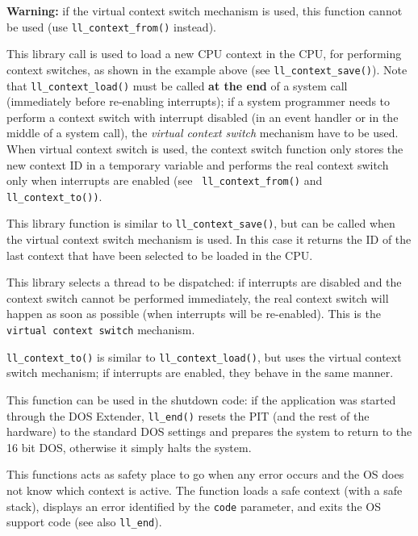 \documentclass[a4paper]{report}
\begin{document}
{\bf Warning:} if the virtual context switch mechanism is used, this
function cannot be used (use {\tt ll\_context\_from()} instead).


This library call is used to load a new CPU context in the CPU, for
performing context switches, as shown in the example above (see
{\tt ll\_context\_save()}). Note that {\tt ll\_context\_load()} must
be called {\bf at the end} of a system call (immediately before re-enabling
interrupts); if a system programmer needs to perform a context switch
with interrupt disabled (in an event handler or in the middle of a
system call), the {\em virtual context switch} mechanism have to be used.
When virtual context switch is used, the context switch function only
stores the new context ID in a temporary variable and performs the
real context switch only when interrupts are enabled (see {\tt
ll\_context\_from()} and {\tt ll\_context\_to())}.


This library function is similar to {\tt ll\_context\_save()}, but
can be called when the virtual context switch mechanism is used. In
this case it returns the ID of the last context that have been
selected to be loaded in the CPU.


This library selects a thread to be dispatched: if interrupts are
disabled and the context switch cannot be performed immediately, the
real context switch will happen as soon as possible (when interrupts
will be re-enabled). This is the {\tt virtual context switch}
mechanism.

{\tt ll\_context\_to()} is similar to {\tt ll\_context\_load()}, but
uses the virtual context switch mechanism; if interrupts are enabled,
they behave in the same manner.


This function can be used in the shutdown code: if the application
was started through the DOS Extender, {\tt ll\_end()} resets the PIT
(and the rest of the hardware) to the standard DOS settings and
prepares the system to return to the 16 bit DOS, otherwise it simply halts the
system.


This functions acts as safety place to go when any error occurs and
the OS does not know which context is active. The function loads a
safe context (with a safe stack), displays an error identified by
the {\tt code} parameter, and exits the OS support code
(see also {\tt ll\_end}).
\end{document}

